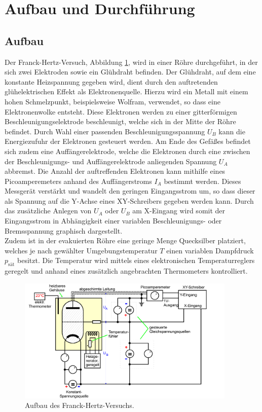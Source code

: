 \section{Aufbau und Durchführung}
\subsection{Aufbau}
\label{sec:Aufbau}

Der Franck-Hertz-Versuch, Abbildung \ref{lel}, wird in einer Röhre durchgeführt, in der sich zwei Elektroden sowie ein Glühdraht befinden.
Der Glühdraht, auf dem eine konstante Heizspannung gegeben wird, dient durch den auftretenden glühelektrischen Effekt als Elektronenquelle.
Hierzu wird ein Metall mit einem hohen Schmelzpunkt, beispielsweise Wolfram, verwendet, so dass eine Elektronenwolke entsteht.
Diese Elektronen werden zu einer gitterförmigen Beschleunigungselektrode beschleunigt, welche sich in der Mitte der Röhre befindet.
Durch Wahl einer passenden Beschleunigungsspannung $U_B$ kann die Energiezufuhr der Elektronen gesteuert werden.
Am Ende des Gefäßes befindet sich zudem eine Auffängerelektrode, welche die Elektronen durch eine zwischen der Beschleunigungs- und Auffängerelektrode anliegenden Spannung $U_A$ abbremst.
Die Anzahl der auftreffenden Elektronen kann mithilfe eines Picoamperemeters anhand des Auffängerstroms $I_A$ bestimmt werden.
Dieses Messgerät verstärkt und wandelt den geringen Eingangsstrom um, so dass dieser als Spannung auf die Y-Achse eines XY-Schreibers gegeben werden kann.
Durch das zusätzliche Anlegen von $U_A$ oder $U_B$ am X-Eingang wird somit der Eingangsstrom in Abhängigkeit einer variablen Beschleunigungs- oder Bremsspannung graphisch dargestellt.
\\

Zudem ist in der evakuierten Röhre eine geringe Menge Quecksilber platziert, welches je nach gewählter Umgebungstemperatur $T$ einen variablen Dampfdruck $p_\text{sät}$ besitzt.
Die Temperatur wird mittels eines elektronischen Temperaturreglers geregelt und anhand eines zusätzlich angebrachten Thermometers kontrolliert.

\begin{figure}[H]
  \centering
  \includegraphics[height=6cm]{ressources/aufbau2.png}
  \caption{Aufbau des Franck-Hertz-Versuchs. \cite{skript}}
  \label{lel}
\end{figure}
